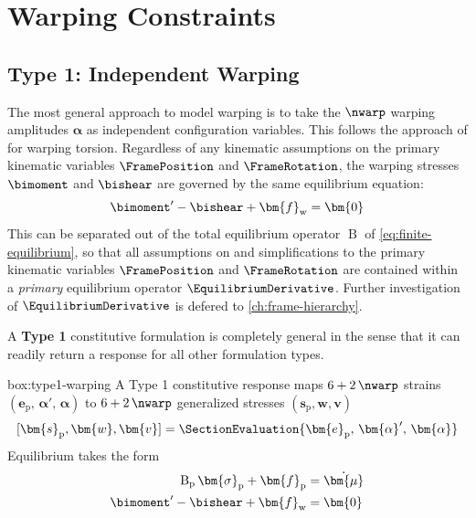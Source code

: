 \section{Warping Constraints}\label{sec:warping-constraints}

\subsection{Type 1: Independent Warping}

The most general approach to model warping is to take the \(\nwarp\) warping amplitudes \(\bm{\alpha}\) as independent configuration variables. This follows the approach of \citep{reissner1952nonuniform} for warping torsion. Regardless of any kinematic assumptions on the primary kinematic variables \(\FramePosition\) and \(\FrameRotation\), the warping stresses \(\bimoment\) and \(\bishear\) are governed by the same equilibrium equation:
\begin{equation*}
    \bimoment' - \bishear + \bm{f}_{\mathrm{w}} = \bm{0}
\end{equation*}
This can be separated out of the total equilibrium operator \(\operatorname{B}\) of \eqref{eq:finite-equilibrium}, so that all assumptions on and simplifications to the primary kinematic variables \(\FramePosition\) and \(\FrameRotation\) are contained within a \emph{primary} equilibrium operator \(\EquilibriumDerivative\). Further investigation of \(\EquilibriumDerivative\) is defered to \cref{ch:frame-hierarchy}.

A \textbf{Type 1} constitutive formulation is completely general in the sense that it can readily return a response for all other formulation types.

\vspace{1ex}
\begin{ambox}{box:type1-warping}
A Type 1 constitutive response maps \(6+2\, \nwarp\) strains \((\bm{e}_{\mathrm{p}},\, \bm{\alpha}',\, \bm{\alpha})\) to \(6+ 2\, \nwarp\) generalized stresses \((\bm{s}_{\mathrm{p}},\bm{w},\bm{v})\)
\[
[\bm{s}_{\mathrm{p}},\bm{w},\bm{v}] = \SectionEvaluation{\bm{e}_{\mathrm{p}},\, \bm{\alpha}',\, \bm{\alpha}}
\]
Equilibrium takes the form 
\begin{equation}
\begin{aligned}
    \operatorname{B}_{\mathrm{p}} \bm{\sigma}_{\mathrm{p}} + \bm{f}_{\mathrm{p}} &= \dot{\bm{\mu}} \\ 
    \bimoment' - \bishear + \bm{f}_{\mathrm{w}} &= \bm{0}
\end{aligned}
\end{equation}
\end{ambox}

